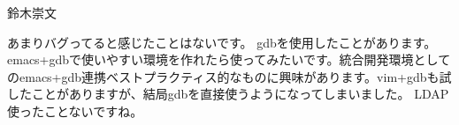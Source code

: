 \begin{prework}{ 鈴木崇文 }

あまりバグってると感じたことはないです。
 gdbを使用したことがあります。emacs+gdbで使いやすい環境を作れたら使ってみたいです。統合開発環境としてのemacs+gdb連携ベストプラクティス的なものに興味があります。vim+gdbも試したことがありますが、結局gdbを直接使うようになってしまいました。
LDAP使ったことないですね。
\end{prework}
